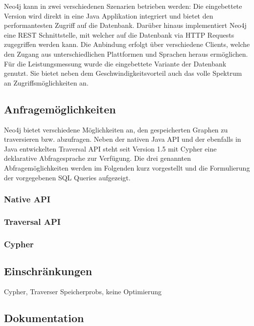 \documentclass[11pt, a4paper, oneside]{article} %
\begin{document}
Neo4j kann in zwei verschiedenen Szenarien betrieben werden: Die eingebettete Version wird direkt in eine Java Applikation integriert und bietet den performantesten Zugriff auf die Datenbank. Darüber hinaus implementiert Neo4j eine REST Schnittstelle, mit welcher auf die Datenbank via HTTP Requests zugegriffen werden kann. Die Anbindung erfolgt über verschiedene Clients, welche den Zugang aus unterschiedlichen Plattformen und Sprachen heraus ermöglichen.\\
Für die Leistungsmessung wurde die eingebettete Variante der Datenbank genutzt. Sie bietet neben dem Geschwindigkeitsvorteil auch das volle Spektrum an Zugriffsmöglichkeiten an.

\subsection{Anfragemöglichkeiten}

Neo4j bietet verschiedene Möglichkeiten an, den gespeicherten Graphen zu traversieren bzw. abzufragen. Neben der nativen Java API und der ebenfalls in Java entwickelten Traversal API steht seit Version 1.5 mit Cypher eine deklarative Abfragesprache zur Verfügung. Die drei genannten Abfragemöglichkeiten werden im Folgenden kurz vorgestellt und die Formulierung der vorgegebenen SQL Queries aufgezeigt.

\subsubsection{Native API}

\subsubsection{Traversal API}

\subsubsection{Cypher}

\subsection{Einschränkungen}

Cypher, Traverser Speicherprobs, keine Optimierung

\subsection{Dokumentation}
\end{document}
